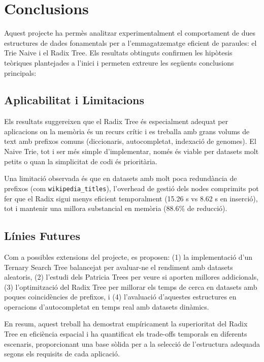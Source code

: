 \section{Conclusions}

Aquest projecte ha permès analitzar experimentalment el comportament de dues estructures de dades fonamentals per a l'emmagatzematge eficient de paraules: el Trie Naive i el Radix Tree. Els resultats obtinguts confirmen les hipòtesis teòriques plantejades a l'inici i permeten extreure les següents conclusions principals:


\subsection{Aplicabilitat i Limitacions}
Els resultats suggereixen que el Radix Tree és especialment adequat per aplicacions on la memòria és un recurs crític i es treballa amb grans volums de text amb prefixos comuns (diccionaris, autocompletat, indexació de genomes). El Naive Trie, tot i ser més simple d'implementar, només és viable per datasets molt petits o quan la simplicitat de codi és prioritària.

Una limitació observada és que en datasets amb molt poca redundància de prefixos (com \texttt{wikipedia\_titles}), l'overhead de gestió dels nodes comprimits pot fer que el Radix sigui menys eficient temporalment (15.26 s vs 8.62 s en inserció), tot i mantenir una millora substancial en memòria (88.6\% de reducció).

\subsection{Línies Futures}
Com a possibles extensions del projecte, es proposen: (1) la implementació d'un Ternary Search Tree balancejat per avaluar-ne el rendiment amb datasets aleatoris, (2) l'estudi dels Patricia Trees per veure si aporten millores addicionals, (3) l'optimització del Radix Tree per millorar els temps de cerca en datasets amb poques coincidències de prefixos, i (4) l'avaluació d'aquestes estructures en operacions d'autocompletat en temps real amb datasets dinàmics.

En resum, aquest treball ha demostrat empíricament la superioritat del Radix Tree en eficiència espacial i ha quantificat els trade-offs temporals en diferents escenaris, proporcionant una base sòlida per a la selecció de l'estructura adequada segons els requisits de cada aplicació.